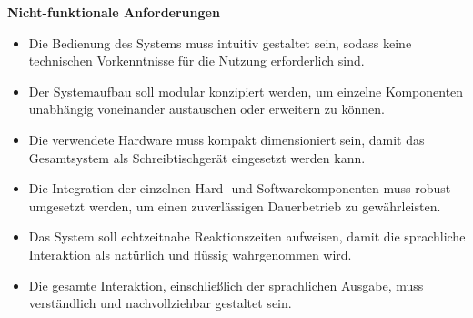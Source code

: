\textbf{Nicht-funktionale Anforderungen}
\begin{itemize}
    \item Die Bedienung des Systems muss intuitiv gestaltet sein, sodass keine technischen Vorkenntnisse für die Nutzung erforderlich sind.
    \item Der Systemaufbau soll modular konzipiert werden, um einzelne Komponenten unabhängig voneinander austauschen oder erweitern zu können.
    \item Die verwendete Hardware muss kompakt dimensioniert sein, damit das Gesamtsystem als Schreibtischgerät eingesetzt werden kann.
    \item Die Integration der einzelnen Hard- und Softwarekomponenten muss robust umgesetzt werden, um einen zuverlässigen Dauerbetrieb zu gewährleisten.
    \item Das System soll echtzeitnahe Reaktionszeiten aufweisen, damit die sprachliche Interaktion als natürlich und flüssig wahrgenommen wird.
    \item Die gesamte Interaktion, einschließlich der sprachlichen Ausgabe, muss verständlich und nachvollziehbar gestaltet sein.
\end{itemize}
